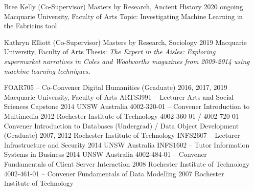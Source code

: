 
\begin{cventries}
\cventry
    {Bree Kelly (Co-Supervisor)}
    {Masters by Research, Ancient History}
    {2020 ongoing}
    {Macquarie University, Faculty of Arts}
    {Topic: Investigating Machine Learning in the Fabricius tool}
    
\cventry
    {Kathryn Elliott (Co-Supervisor)}
    {Masters by Research, Sociology}
    {2019}
    {Macquarie University, Faculty of Arts}
    {Thesis: \textit{The Expert in the Aisles: Exploring
supermarket narratives in Coles and Woolworths magazines from 2009-2014 using machine learning techniques.}}
    
\end{cventries}


\begin{cventries}
\cventry
    {FOAR705 -- Co-Convener}
    {Digital Humanities (Graduate)}
    {2016, 2017, 2019}
    {Macquarie University, Faculty of Arts}
    {}
\cventry
    {ARTS3991 -- Lecturer}
    {Arts and Social Sciences Capstone}
    {2014}
    {UNSW Australia}
    {}  
\cventry
    {4002-320-01 -- Convener}
    {Introduction to Multimedia}
    {2012}
    {Rochester Institute of Technology}
    {}  
\cventry
    {4002-360-01 / 4002-720-01 -- Convener}
    {Introduction to Databases (Undergrad) / Data Object Development (Graduate)}
    {2007, 2012}
    {Rochester Institute of Technology}
    {}   
\cventry
    {INFS2607 -- Lecturer}
    {Infrastructure and Security}
    {2014}
    {UNSW Australia}
    {}     
\cventry
    {INFS1602 -- Tutor}
    {Information Systems in Business}
    {2014}
    {UNSW Australia}
    {}    
\cventry
    {4002-484-01 -- Convener}
    {Fundamentals of Client Server Interaction}
    {2008}
    {Rochester Institute of Technology}
    {}      
\cventry
    {4002-461-01 -- Convener}
    {Fundamentals of Data Modelling}
    {2007}
    {Rochester Institute of Technology}
    {}     
\end{cventries}